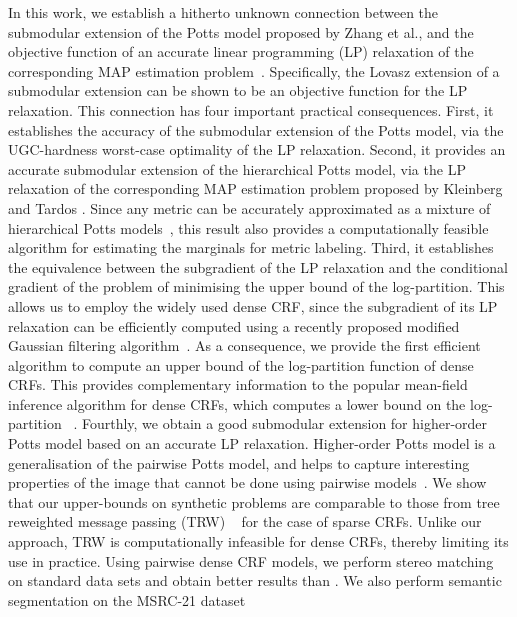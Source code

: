 In this work, we establish a hitherto unknown connection between the submodular
extension of the Potts model proposed by Zhang et al.\citep{zhang2015higher}, and the
objective function of an accurate linear programming (LP) relaxation of the
corresponding MAP estimation problem~\citep{kleinberg2002approximation}. Specifically, the Lovasz extension of a submodular extension can be shown to be an objective function for the LP relaxation. This
connection has four important practical consequences. First, it establishes
the accuracy of the submodular extension of the Potts model, via the
UGC-hardness worst-case optimality of the LP relaxation. Second, it provides an
accurate submodular extension of the hierarchical Potts model, via the LP
relaxation of the corresponding MAP estimation problem proposed
by Kleinberg and Tardos \citep{kleinberg2002approximation}. Since any metric can be accurately
approximated as a mixture of hierarchical Potts
models~\citep{bartal1996probabilistic, bartal1998approximating}, this result
also provides a computationally feasible algorithm for estimating the marginals
for metric labeling. Third, it establishes the equivalence between the
subgradient of the LP relaxation and the conditional gradient of the problem of
minimising the upper bound of the log-partition. This allows us to employ the
widely used dense CRF, since the subgradient of its LP relaxation can be
efficiently computed using a recently proposed modified Gaussian filtering
algorithm~\citep{ajanthan2017efficient}. As a consequence, we provide the first
efficient algorithm to compute an upper bound of the log-partition function of
dense CRFs. This provides complementary information to the popular mean-field
inference algorithm for dense CRFs, which computes a lower bound on the
log-partition ~\citep{koltun2011efficient}. Fourthly, we obtain a good 
submodular extension for higher-order Potts model based on an accurate LP
relaxation. Higher-order Potts model is a generalisation of the pairwise Potts
model, and helps to capture interesting properties of the image that cannot be
done using pairwise models~\citep{vineet2014filter, kohli2007p3}. We show that our upper-bounds on synthetic problems are comparable to those from tree reweighted message passing (TRW)
~\citep{wainwright2005new} for the case of sparse CRFs. Unlike our approach,
TRW is computationally infeasible for dense CRFs, thereby limiting its use in
practice. Using pairwise dense CRF models, we perform stereo matching on standard
data sets and obtain better results than \citep{koltun2011efficient}. We also perform semantic segmentation on the MSRC-21 dataset 

